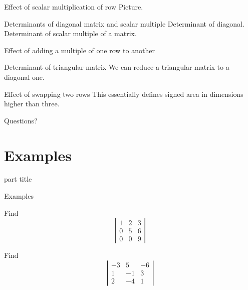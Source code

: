 \documentclass{beamer}
\begin{document}
\begin{frame}{Effect of scalar multiplication of row}
  Picture.
\end{frame}

\begin{frame}{Determinants of diagonal matrix and scalar multiple}
  Determinant of diagonal.
  Determinant of scalar multiple of a matrix.
\end{frame}

\begin{frame}{Effect of adding a multiple of one row to another}
  
\end{frame}

\begin{frame}{Determinant of triangular matrix}
  We can reduce a triangular matrix to a diagonal one.
\end{frame}

\begin{frame}{Effect of swapping two rows}
  This essentially defines signed area in dimensions higher than three.
\end{frame}

\begin{frame}
  Questions?
\end{frame}

\section{Examples}

\begin{frame}
  \begin{beamercolorbox}[sep=12pt,center]{part title}
    \insertsection\par
  \end{beamercolorbox}
\end{frame}

\begin{frame}{Examples}
  \begin{example}
    Find
    \begin{equation*}
      \left|
	\begin{array}{ccc}
          1&2&3\\
          0&5&6\\
          0&0&9
	\end{array}
      \right|
    \end{equation*}
  \end{example}
  \begin{example}
    Find
    \begin{equation*}
      \left|
        \begin{array}{ccc}
          -3&5&-6\\
          1&-1&3\\
          2&-4&1
        \end{array}
      \right|
    \end{equation*}
  \end{example}
\end{frame}
\end{document}
